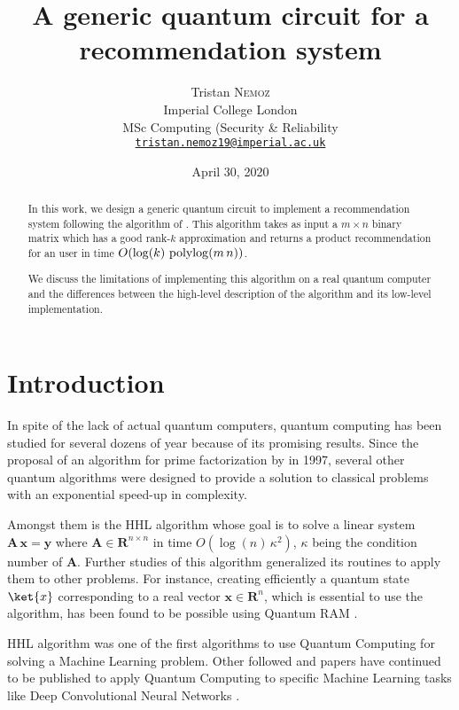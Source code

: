 \documentclass[11pt, a4paper]{article}
\date{April 30, 2020}
\author{Tristan \textsc{Nemoz}\\Imperial College London\\MSc Computing (Security \& Reliability\\\href{mailto:tristan.nemoz19@imperial.ac.uk}{\texttt{tristan.nemoz19@imperial.ac.uk}}}
\title{A generic quantum circuit for a recommendation system}
\begin{document}
	
	\maketitle
    \begin{abstract}
        In this work, we design a generic quantum circuit to implement a recommendation system following the algorithm of \citeauthor{QRS}. This algorithm takes as input a \(m\times n\) binary matrix which has a good rank-\(k\) approximation and returns a product recommendation for an user in time \(O(\log(k)\,\operatorname{polylog}(m\,n))\).
        
        We discuss the limitations of implementing this algorithm on a real quantum computer and the differences between the high-level description of the algorithm and its low-level implementation.
    \end{abstract}
    
    \section{Introduction}
        In spite of the lack of actual quantum computers, quantum computing has been studied for several dozens of year because of its promising results. Since the proposal of an algorithm for prime factorization \cite{Shor} by \citeauthor{Shor} in 1997, several other quantum algorithms were designed to provide a solution to classical problems with an exponential speed-up in complexity.
        
        Amongst them is the HHL algorithm \cite{HHL} whose goal is to solve a linear system \(\mathbf{A}\,\mathbf{x}=\mathbf{y}\) where \(\mathbf{A}\in\mathbf{R}^{n\times n}\) in time \(O\left(\log(n)\,\kappa^2\right)\), \(\kappa\) being the condition number of \(\mathbf{A}\). Further studies of this algorithm generalized its routines to apply them to other problems. For instance, creating efficiently a quantum state \(\ket{x}\) corresponding to a real vector \(\mathbf{x}\in\mathbf{R}^n\), which is essential to use the algorithm, has been found to be possible using Quantum RAM \cite{Prakash, QRAM, QRAMCircuit}.
        
        HHL algorithm was one of the first algorithms to use Quantum Computing for solving a Machine Learning problem. Other followed and papers have continued to be published to apply Quantum Computing to specific Machine Learning tasks like Deep Convolutional Neural Networks \cite{QCNN}.
        
\end{document}
